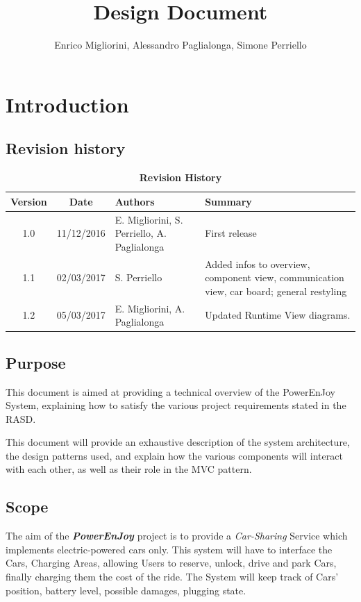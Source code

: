\documentclass[12pt]{article}
\title{Design Document}
\author{Enrico Migliorini, Alessandro Paglialonga, Simone Perriello}
\begin{document}
\maketitle
\clearpage
\tableofcontents
\clearpage

\section{Introduction}
\subsection{Revision history}
\begin{longtable}{| c | c | p{40mm}  | p{50mm} |}
	\caption{\textbf{Revision History}}
	\label{tab:rev_history}
	\\ \hline
	
	\textbf{Version} & \textbf{Date} & \textbf{Authors} & \textbf{Summary}\\ \hline
	1.0 & 11/12/2016& E. Migliorini, S. Perriello, A. Paglialonga & First release\\ \hline
	1.1 & 02/03/2017& S. Perriello & Added infos to overview, component view, communication view, car board; general restyling\\ \hline
	1.2 & 05/03/2017 & E. Migliorini, A. Paglialonga & Updated Runtime View diagrams.\\ \hline
	
\end{longtable}
\subsection{Purpose}
This document is aimed at providing a technical overview of the PowerEnJoy System, explaining how to satisfy the various project requirements stated in the RASD.

This document will provide an exhaustive description of the system architecture, the design patterns used, and explain how the various components will interact with each other, as well as their role in the MVC pattern.
\subsection{Scope}
The aim of the \textbf{\emph{PowerEnJoy}} project is to provide a \textit{Car-Sharing} Service which implements electric-powered cars only.
This system will have to interface the Cars, Charging Areas, allowing Users to reserve, unlock, drive and park Cars, finally charging them the cost of the ride. 
The System will keep track of Cars' position, battery level, possible damages, plugging state.
\end{document}
